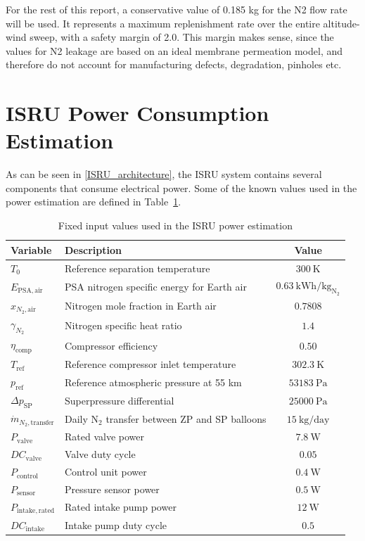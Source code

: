 For the rest of this report, a conservative value of 0.185 kg for the N2 flow rate will be used. It represents a maximum replenishment rate over the entire altitude-wind sweep, with a safety margin of 2.0. This margin makes sense, since the values for N2 leakage are based on an ideal membrane permeation model, and therefore do not account for manufacturing defects, degradation, pinholes etc. 





\section{ISRU Power Consumption Estimation}

As can be seen in \autoref{ISRU_architecture}, the ISRU system contains several components that consume electrical power. Some of the known values used in the power estimation are defined in Table~\ref{tab:isru_power_inputs}.

\begin{table}[H]
\centering
\caption{Fixed input values used in the ISRU power estimation}
\label{tab:isru_power_inputs}
\renewcommand{\arraystretch}{1}
\begin{tabular}{l l c}
\toprule
\textbf{Variable} & \textbf{Description} & \textbf{Value} \\
\midrule
$T_0$ & Reference separation temperature & $300~\mathrm{K}$ \cite{Hall2021} \\
$E_{\mathrm{PSA,air}}$ & PSA nitrogen specific energy for Earth air & $0.63~\mathrm{kWh/kg_{N_2}}$ \\
$x_{N_2,\mathrm{air}}$ & Nitrogen mole fraction in Earth air & $0.7808$ \\
$\gamma_{N_2}$ & Nitrogen specific heat ratio & $1.4$ \\
$\eta_{\mathrm{comp}}$ & Compressor efficiency & $0.50$ \\
$T_{\mathrm{ref}}$ & Reference compressor inlet temperature & $302.3~\mathrm{K}$ \cite{Hall2021} \\
$p_{\mathrm{ref}}$ & Reference atmospheric pressure at 55 km & $53183~\mathrm{Pa}$ \cite{Hall2021} \\
$\Delta p_{\mathrm{SP}}$ & Superpressure differential & $25000~\mathrm{Pa}$ \\
$\dot{m}_{N_2,\mathrm{transfer}}$ & Daily N$_2$ transfer between ZP and SP balloons & $15~\mathrm{kg/day}$ \\
$P_{\mathrm{valve}}$ & Rated valve power & $7.8~\mathrm{W}$ \\
$DC_{\mathrm{valve}}$ & Valve duty cycle & $0.05$ \\
$P_{\mathrm{control}}$ & Control unit power & $0.4~\mathrm{W}$ \\
$P_{\mathrm{sensor}}$ & Pressure sensor power & $0.5~\mathrm{W}$ \\
$P_{\mathrm{intake,rated}}$ & Rated intake pump power & $12 ~\mathrm{W}$ \\
$DC_{\mathrm{intake}}$ & Intake pump duty cycle & $0.5$ \\
\bottomrule
\end{tabular}
\end{table}

